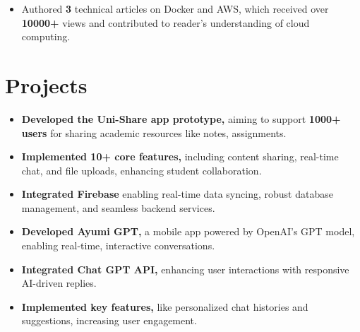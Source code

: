 \documentclass[]{deedy-resume-openfont}
\begin{document}
\begin{minipage}[t]{0.66\textwidth}
\vspace{\topsep}
\begin{itemize}[leftmargin=*]
    \item Authored \textbf{3} technical articles on Docker and AWS, which received over \textbf{10000+} views and contributed to reader's understanding of cloud computing.
\end{itemize}

\sectionsep

\vspace{-2.5mm}
\section{Projects}
\begin{itemize}[leftmargin=*]
    \item \textbf{Developed the Uni-Share app prototype,} aiming to support \textbf{1000+ users} for sharing academic resources like notes, assignments.
    \vspace{-2.3mm} %
    \item \textbf{Implemented 10+ core features,} including content sharing, real-time chat, and file uploads, enhancing student collaboration.
    \vspace{-2.3mm}
    \item \textbf{Integrated Firebase} enabling real-time data syncing, robust database management, and seamless backend services.
\end{itemize}
\sectionsep

\begin{itemize}[leftmargin=*]
    \item \textbf{Developed Ayumi GPT,} a mobile app powered by OpenAI’s GPT model, enabling real-time, interactive conversations.
    \vspace{-2.4mm} %
    \item \textbf{Integrated Chat GPT API,} enhancing user interactions with responsive AI-driven replies.
    \vspace{-2.4mm}
    \item \textbf{Implemented key features,} like personalized chat histories and suggestions, increasing user engagement.
\end{itemize}
\sectionsep

\end{minipage} 
\end{document}
